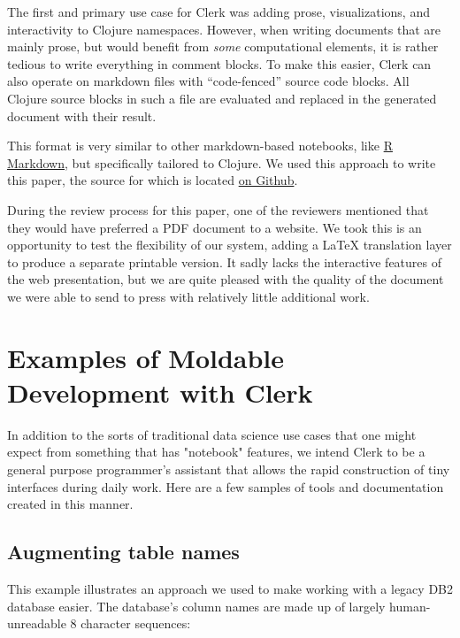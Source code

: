 \documentclass[sigconf,screen]{acmart}
\begin{document}
The first and primary use case for Clerk was adding prose, visualizations, and interactivity to Clojure namespaces. However, when writing documents that are mainly prose, but would benefit from \emph{some} computational elements, it is rather tedious to write everything in comment blocks. To make this easier, Clerk can also operate on markdown files with ``code-fenced'' source code blocks. All Clojure source blocks in such a file are evaluated and replaced in the generated document with their result.

This format is very similar to other markdown-based notebooks, like \href{https://rmarkdown.rstudio.com}{R Markdown}, but specifically tailored to Clojure. We used this approach to write this paper, the source for which is located \href{https://github.com/mk/clerk-px23}{on Github}.

During the review process for this paper, one of the reviewers mentioned that they would have preferred a PDF document to a website. We took this is an opportunity to test the flexibility of our system, adding a LaTeX translation layer to produce a separate printable version. It sadly lacks the interactive features of the web presentation, but we are quite pleased with the quality of the document we were able to send to press with relatively little additional work.

\hypertarget{id}{%
\section{Examples of Moldable Development with Clerk}\label{id}}

In addition to the sorts of traditional data science use cases that one might expect from something that has "notebook" features, we intend Clerk to be a general purpose programmer's assistant that allows the rapid construction of tiny interfaces during daily work. Here are a few samples of tools and documentation created in this manner.

\hypertarget{id}{%
\subsection{Augmenting table names}\label{id}}

This example illustrates an approach we used to make working with a legacy DB2 database easier. The database's column names are made up of largely human-unreadable 8 character sequences:
\end{document}
